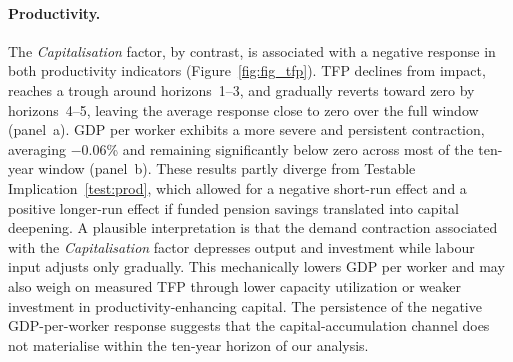 \documentclass[11pt,english,a4paper, twoside, authoryear]{article}
\begin{document}
\paragraph{Productivity.}
The \textit{Capitalisation}  factor, by contrast, is associated with a negative response in both productivity indicators (Figure~\ref{fig:fig_tfp}). TFP declines from impact, reaches a trough around horizons~1--3, and gradually reverts toward zero by horizons~4--5, leaving the average response close to zero over the full window (panel~a). GDP per worker exhibits a more severe and persistent contraction, averaging $-$0.06\% and remaining significantly below zero across most of the ten-year window (panel~b). These results partly diverge from Testable Implication~\ref{test:prod}, which allowed for a negative short-run effect and a positive longer-run effect if funded pension savings translated into capital deepening. A plausible interpretation is that the demand contraction  associated with the \textit{Capitalisation} factor depresses output and investment while labour input adjusts only gradually. This mechanically lowers GDP per worker and may also weigh on measured TFP through lower capacity utilization or weaker investment in productivity-enhancing capital. The persistence of the negative GDP-per-worker response suggests that the capital-accumulation channel does not materialise within the ten-year horizon of our analysis.\\
\end{document}
